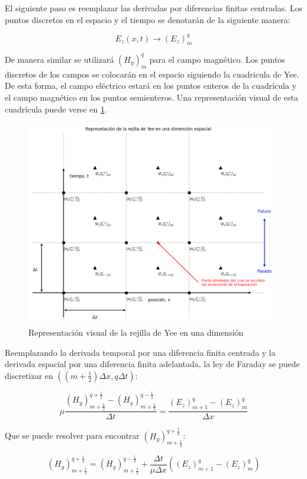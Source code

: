 El siguiente paso es reemplazar las derivadas por diferencias finitas centradas. Los puntos discretos en el espacio y el tiempo se denotarán de la siguiente manera:

\begin{equation}
    E_z(x, t) \rightarrow (E_z)^q_m 
\end{equation}

De manera similar se utilizará $(H_y)^q_m$ para el campo magnético. Los puntos discretos de los campos se colocarán en el espacio siguiendo la cuadricula de Yee. De esta forma, el campo eléctrico estará en los puntos enteros de la cuadrícula y el campo magnético en los puntos semienteros. Una representación visual de esta cuadrícula puede verse en \ref{fig:yee_grid_1D}.

\begin{figure}[h]
    \centering
    \includegraphics[width=0.7\linewidth]{figures/yee_grid.png}
    \caption{Representación visual de la rejilla de Yee en una dimensión}
    \label{fig:yee_grid_1D}
\end{figure}

Reemplazando la derivada temporal por una diferencia finita centrada y la derivada espacial por una diferencia finita adelantada, la ley de Faraday se puede discretizar en $\left((m + \frac{1}{2})\Delta x, q\Delta t\right)$:

\begin{equation}
    \mu \frac{(H_y)^{q+\frac{1}{2}}_{m+\frac{1}{2}} - (H_y)^{q-\frac{1}{2}}_{m+\frac{1}{2}}}{\Delta t} = \frac{(E_z)^q_{m+1}- (E_z)^q_{m}}{\Delta x}
\end{equation}

Que se puede resolver para encontrar $(H_y)^{q+\frac{1}{2}}_{m+\frac{1}{2}}$:

\begin{equation}\label{ec:update_H_1D}
    (H_y)^{q+\frac{1}{2}}_{m+\frac{1}{2}} = (H_y)^{q-\frac{1}{2}}_{m+\frac{1}{2}} + \frac{\Delta t}{\mu \Delta x} ((E_z)^q_{m+1}- (E_z)^q_{m})
\end{equation}

